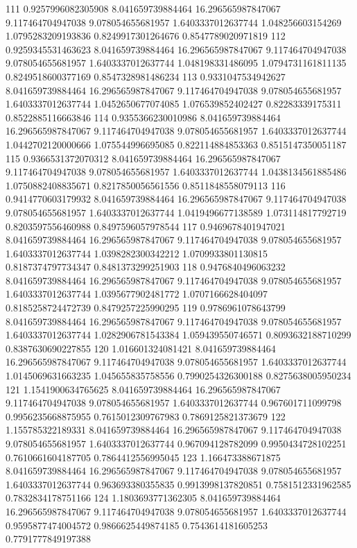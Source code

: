 {111 0.9257996082305908 8.041659739884464 16.296565987847067 9.117464704947038 9.078054655681957 1.6403337012637744 1.048256603154269 1.0795283209193836 0.8249917301264676 0.8547789020971819
112 0.9259345531463623 8.041659739884464 16.296565987847067 9.117464704947038 9.078054655681957 1.6403337012637744 1.048198331486095 1.0794731161811135 0.8249518600377169 0.8547328981486234
113 0.9331047534942627 8.041659739884464 16.296565987847067 9.117464704947038 9.078054655681957 1.6403337012637744 1.0452650677074085 1.076539852402427 0.82283339175311 0.8522885116663846
114 0.9355366230010986 8.041659739884464 16.296565987847067 9.117464704947038 9.078054655681957 1.6403337012637744 1.0442702120000666 1.075544996695085 0.822114884853363 0.8515147350051187
115 0.9366531372070312 8.041659739884464 16.296565987847067 9.117464704947038 9.078054655681957 1.6403337012637744 1.0438134561885486 1.0750882408835671 0.8217850056561556 0.8511848558079113
116 0.9414770603179932 8.041659739884464 16.296565987847067 9.117464704947038 9.078054655681957 1.6403337012637744 1.0419496677138589 1.073114817792719 0.8203597556460988 0.8497596057978544
117 0.9469678401947021 8.041659739884464 16.296565987847067 9.117464704947038 9.078054655681957 1.6403337012637744 1.0398282300342212 1.0709933801130815 0.8187374797734347 0.8481373299251903
118 0.9476840496063232 8.041659739884464 16.296565987847067 9.117464704947038 9.078054655681957 1.6403337012637744 1.0395677902481772 1.0707166628404097 0.8185258724472739 0.8479257225990295
119 0.9786961078643799 8.041659739884464 16.296565987847067 9.117464704947038 9.078054655681957 1.6403337012637744 1.0282906781543384 1.059439550746571 0.8093632188710299 0.8387630690227855
120 1.016601324081421 8.041659739884464 16.296565987847067 9.117464704947038 9.078054655681957 1.6403337012637744 1.0145069631663235 1.045655835758556 0.7990254326300188 0.8275638005950234
121 1.1541900634765625 8.041659739884464 16.296565987847067 9.117464704947038 9.078054655681957 1.6403337012637744 0.967601711099798 0.9956235668875955 0.7615012309767983 0.7869125821373679
122 1.155785322189331 8.041659739884464 16.296565987847067 9.117464704947038 9.078054655681957 1.6403337012637744 0.967094128782099 0.9950434728102251 0.7610661604187705 0.7864412556995045
123 1.166473388671875 8.041659739884464 16.296565987847067 9.117464704947038 9.078054655681957 1.6403337012637744 0.963693380355835 0.9913998137820851 0.7581512331962585 0.7832834178751166
124 1.1803693771362305 8.041659739884464 16.296565987847067 9.117464704947038 9.078054655681957 1.6403337012637744 0.9595877474004572 0.9866625449874185 0.7543614181605253 0.7791777849197388
}
